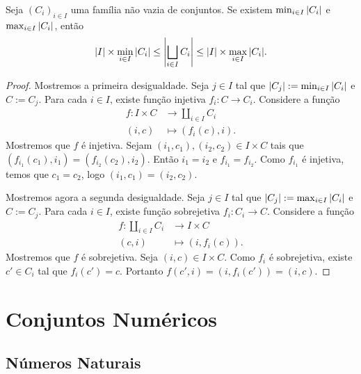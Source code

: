 \begin{teo}
Seja $(C_i)_{i \in I}$ uma família não vazia de conjuntos. Se existem $\min_{i \in I}{\left\vert{C_i}\right\vert}$ e $\max_{i \in I}{\left\vert{C_i}\right\vert}$, então
\begin{equation*}
\left\vert{I}\right\vert \times \min_{i \in I}{\left\vert{C_i}\right\vert} \leq \left\vert{\bigsqcup_{i \in I} C_i}\right\vert \leq \left\vert{I}\right\vert \times \max_{i \in I}{\left\vert{C_i}\right\vert}.
\end{equation*}
\end{teo}
\begin{proof}
Mostremos a primeira desigualdade. Seja $j \in I$ tal que $\left\vert{C_j}\right\vert := \min_{i \in I}{\left\vert{C_i}\right\vert}$ e $C := C_j$. Para cada $i \in I$, existe função injetiva $f_i: C \to C_i$. Considere a função
	\begin{align*}
	f: I \times C &\to \coprod_{i \in I} C_i \\
			(i,c) &\mapsto (f_i(c),i).
	\end{align*}
Mostremos que $f$ é injetiva. Sejam $(i_1,c_1),(i_2,c_2) \in I \times C$ tais que $(f_{i_1}(c_1),i_1)=(f_{i_2}(c_2),i_2)$. Então $i_1=i_2$ e $f_{i_1}=f_{i_2}$. Como $f_{i_1}$ é injetiva, temos que $c_1=c_2$, logo $(i_1,c_1)=(i_2,c_2)$.

Mostremos agora a segunda desigualdade. Seja $j \in I$ tal que $\left\vert{C_j}\right\vert := \max_{i \in I}{\left\vert{C_i}\right\vert}$ e $C := C_j$. Para cada $i \in I$, existe função sobrejetiva $f_i: C_i \to C$. Considere a função
	\begin{align*}
	f: \coprod_{i \in I} C_i &\to I \times C \\
			(c,i) &\mapsto (i,f_i(c)).
	\end{align*}
Mostremos que $f$ é sobrejetiva. Seja $(i,c) \in I \times C$. Como $f_i$ é sobrejetiva, existe $c' \in C_i$ tal que $f_i(c')=c$. Portanto $f(c',i)=(i,f_i(c'))=(i,c)$.	
\end{proof}








\chapter{Conjuntos Numéricos}


\section{Números Naturais}

